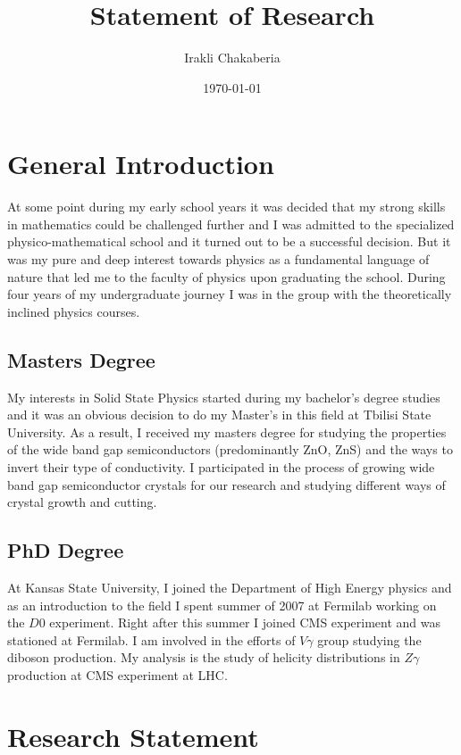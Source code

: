 \documentclass[a4paper]{article}
\title{Statement of Research}
\author{Irakli Chakaberia}
\date{\today}
\begin{document}
\fontsize{12}{15}
\selectfont
\maketitle

\section{General Introduction}

At some point during my early school years it was decided that my strong skills in mathematics could be challenged further and I was admitted to the specialized physico-mathematical school and it turned out to be a successful decision. But it was my pure and deep interest towards physics as a fundamental language of nature that led me to the faculty of physics upon graduating the school. During four years of my undergraduate journey I was in the group with the theoretically inclined physics courses.

\subsection{Masters Degree}

My interests in Solid State Physics started during my bachelor's degree studies and it was an obvious decision to do my Master's in this field at Tbilisi State University. As a result, I received my masters degree for studying the properties of the wide band gap semiconductors (predominantly ZnO, ZnS) and the ways to invert their type of conductivity. I participated in the process of growing wide band gap semiconductor crystals for our research and studying different ways of crystal growth and cutting.

\subsection{PhD Degree}

At Kansas State University, I joined the Department of High Energy physics and as an introduction to the field I spent summer of 2007 at Fermilab working on the $D0$ experiment. Right after this summer I joined CMS experiment and was stationed at Fermilab. I am involved in the efforts of $V\gamma$ group studying the diboson production. My analysis is the study of helicity distributions in $Z\gamma$ production at CMS experiment at LHC.

\section{Research Statement}
\end{document}
